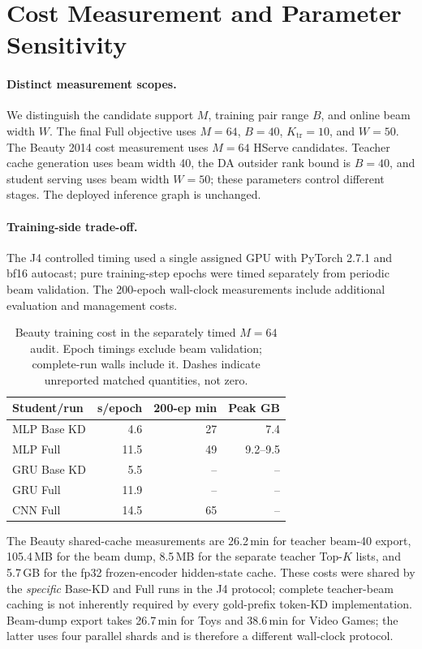 \documentclass[sigconf, anonymous, review]{acmart}
\begin{document}
\section{Cost Measurement and Parameter Sensitivity}
\label{sec:sup-cost}

\paragraph{Distinct measurement scopes.}
We distinguish the candidate support $M$, training pair range $B$,
and online beam width $W$. The final Full objective uses
$M=64$, $B=40$, $K_{\mathrm{tr}}=10$, and $W=50$.
The Beauty 2014 cost measurement uses $M=64$ HServe candidates.
Teacher cache generation uses beam width 40, the DA outsider
rank bound is $B=40$, and student serving uses beam width
$W=50$; these parameters control different stages.
The deployed inference graph is unchanged.

\paragraph{Training-side trade-off.}
The J4 controlled timing used a single assigned GPU with
PyTorch 2.7.1 and bf16 autocast; pure training-step epochs
were timed separately from periodic beam validation. The
200-epoch wall-clock measurements include additional
evaluation and management costs.

\begin{table}[t]
\centering\small
\caption{Beauty training cost in the separately timed
$M=64$ audit. Epoch timings exclude beam validation;
complete-run walls include it. Dashes indicate unreported
matched quantities, not zero.}
\label{tab:sup-cost-train}
\setlength{\tabcolsep}{3.5pt}
\begin{tabular}{lrrr}
\toprule
Student/run & s/epoch & 200-ep min & Peak GB\\
\midrule
MLP Base KD & 4.6 & 27 & 7.4\\
MLP Full & 11.5 & 49 & 9.2--9.5\\
GRU Base KD & 5.5 & -- & --\\
GRU Full & 11.9 & -- & --\\
CNN Full & 14.5 & 65 & --\\
\bottomrule
\end{tabular}
\end{table}

The Beauty shared-cache measurements are 26.2\,min for
teacher beam-40 export, 105.4\,MB for the beam dump,
8.5\,MB for the separate teacher Top-$K$ lists, and
5.7\,GB for the fp32 frozen-encoder hidden-state cache.
These costs were shared by the \emph{specific} Base-KD and
Full runs in the J4 protocol; complete teacher-beam caching
is not inherently required by every gold-prefix token-KD
implementation. Beam-dump export takes 26.7\,min for Toys and
38.6\,min for Video Games; the latter uses four parallel
shards and is therefore a different wall-clock protocol.
\end{document}
